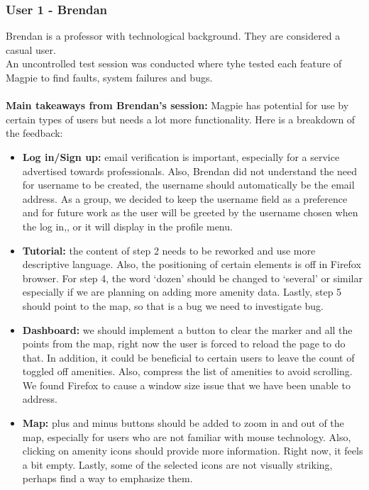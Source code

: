 \subsubsection{User 1 - Brendan}
Brendan is a professor with technological background. They are considered a casual user.\\
An uncontrolled test session was conducted where tyhe tested each feature of Magpie to find faults, system failures and bugs.\\ \\
\textbf{Main takeaways from Brendan's session: }Magpie has potential for use by certain types of users but needs a lot more functionality. Here is a breakdown of the feedback:
\begin{itemize}
    \item \textbf{Log in/Sign up: } email verification is important, especially for a service advertised towards professionals. Also, Brendan did not understand the need for username to be created, the username should automatically be the email address. As a group, we decided to keep the username field as a preference and for future work as the user will be greeted by the username chosen when the log in,, or it will display in the profile menu.\\
    \item \textbf{Tutorial: }the content of step 2 needs to be reworked and use more descriptive language. Also, the positioning of certain elements is off in Firefox browser. For step 4, the word `dozen' should be changed to `several' or similar especially if we are planning on adding more amenity data. Lastly, step 5 should point to the map, so that is a bug we need to investigate bug.\\
    \item \textbf{Dashboard: }we should implement a button to clear the marker and all the points from the map, right now the user is forced to reload the page to do that. In addition, it could be beneficial to certain users to leave the count of toggled off amenities. Also, compress the list of amenities to avoid scrolling.\\ We found Firefox to cause a window size issue that we have been unable to address.\\
    \item \textbf{Map: } plus and minus buttons should be added to zoom in and out of the map, especially for users who are not familiar with mouse technology. Also, clicking on amenity icons should provide more information. Right now, it feels a bit empty. Lastly, some of the selected icons are not visually striking, perhaps find a way to emphasize them.\\

\end{itemize}

